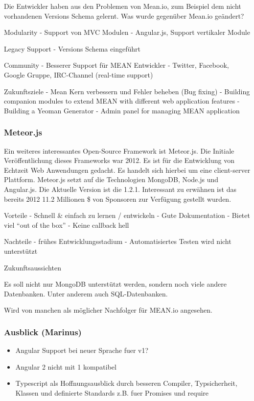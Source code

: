 \documentclass[]{article}
\begin{document}
Die Entwickler haben aus den Problemen von Mean.io, zum Beispiel dem
nicht vorhandenen Versions Schema gelernt. Was wurde gegenüber Mean.io
geändert?

Modularity - Support von MVC Modulen - Angular.js, Support vertikaler
Module

Legacy Support - Versions Schema eingeführt

Community - Besserer Support für MEAN Entwickler - Twitter, Facebook,
Google Gruppe, IRC-Channel (real-time support)

Zukunftsziele - Mean Kern verbessern und Fehler beheben (Bug fixing) -
Building companion modules to extend MEAN with different web application
features - Building a Yeoman Generator - Admin panel for managing MEAN
application

\subsubsection{Meteor.js}\label{meteor.js}

Ein weiteres interessantes Open-Source Framework ist Meteor.js. Die
Initiale Veröffentlichung dieses Frameworks war 2012. Es ist für die
Entwicklung von Echtzeit Web Anwendungen gedacht. Es handelt sich
hierbei um eine client-server Plattform. Meteor.js setzt auf die
Technologien MongoDB, Node.js und Angular.js. Die Aktuelle Version ist
die 1.2.1. Interessant zu erwähnen ist das bereits 2012 11.2 Millionen
\$ von Sponsoren zur Verfügung gestellt wurden.

Vorteile - Schnell \& einfach zu lernen / entwickeln - Gute
Dokumentation - Bietet viel ``out of the box'' - Keine callback hell

Nachteile - frühes Entwicklungsstadium - Automatisiertes Testen wird
nicht unterstützt

Zukunftsaussichten

Es soll nicht nur MongoDB unterstützt werden, sondern noch viele andere
Datenbanken. Unter anderem auch SQL-Datenbanken.

Wird von manchen als möglicher Nachfolger für MEAN.io angesehen.

\subsubsection{Ausblick (Marinus)}\label{ausblick-marinus}

\begin{itemize}
\itemsep1pt\parskip0pt
\item
  Angular Support bei neuer Sprache fuer v1?
\item
  Angular 2 nicht mit 1 kompatibel
\item
  Typescript als Hoffnungsausblick durch besseren Compiler,
  Typsicherheit, Klassen und definierte Standards z.B. fuer Promises und
  require
\end{itemize}
\end{document}
